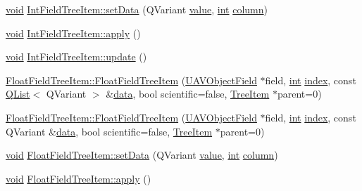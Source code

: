 \begin{DoxyCompactItemize}
\item 
\hyperlink{group___u_a_v_objects_plugin_ga444cf2ff3f0ecbe028adce838d373f5c}{void} \hyperlink{group___u_a_v_object_browser_plugin_ga3a9f3c8507db3aeab86e7bfafd5ab91b}{Int\-Field\-Tree\-Item\-::set\-Data} (Q\-Variant \hyperlink{glext_8h_aa0e2e9cea7f208d28acda0480144beb0}{value}, \hyperlink{ioapi_8h_a787fa3cf048117ba7123753c1e74fcd6}{int} \hyperlink{glext_8h_a3b58c39b1b7ca6f4012b27e84de3bdb3}{column})
\item 
\hyperlink{group___u_a_v_objects_plugin_ga444cf2ff3f0ecbe028adce838d373f5c}{void} \hyperlink{group___u_a_v_object_browser_plugin_ga24ca9e240126f614a138454ca00bd6b1}{Int\-Field\-Tree\-Item\-::apply} ()
\item 
\hyperlink{group___u_a_v_objects_plugin_ga444cf2ff3f0ecbe028adce838d373f5c}{void} \hyperlink{group___u_a_v_object_browser_plugin_ga8d58b6ded0f3e8c6d46cd4de99d0f061}{Int\-Field\-Tree\-Item\-::update} ()
\item 
\hyperlink{group___u_a_v_object_browser_plugin_ga3b5f17797e8c15bda91990e0224e64fd}{Float\-Field\-Tree\-Item\-::\-Float\-Field\-Tree\-Item} (\hyperlink{class_u_a_v_object_field}{U\-A\-V\-Object\-Field} $\ast$field, \hyperlink{ioapi_8h_a787fa3cf048117ba7123753c1e74fcd6}{int} \hyperlink{glext_8h_ab47dd9958bcadea08866b42bf358e95e}{index}, const \hyperlink{class_q_list}{Q\-List}$<$ Q\-Variant $>$ \&\hyperlink{glext_8h_a8850df0785e6fbcc2351af3b686b8c7a}{data}, bool scientific=false, \hyperlink{class_tree_item}{Tree\-Item} $\ast$parent=0)
\item 
\hyperlink{group___u_a_v_object_browser_plugin_ga2295cc6ac1cdf63b9bf6a35970e79669}{Float\-Field\-Tree\-Item\-::\-Float\-Field\-Tree\-Item} (\hyperlink{class_u_a_v_object_field}{U\-A\-V\-Object\-Field} $\ast$field, \hyperlink{ioapi_8h_a787fa3cf048117ba7123753c1e74fcd6}{int} \hyperlink{glext_8h_ab47dd9958bcadea08866b42bf358e95e}{index}, const Q\-Variant \&\hyperlink{glext_8h_a8850df0785e6fbcc2351af3b686b8c7a}{data}, bool scientific=false, \hyperlink{class_tree_item}{Tree\-Item} $\ast$parent=0)
\item 
\hyperlink{group___u_a_v_objects_plugin_ga444cf2ff3f0ecbe028adce838d373f5c}{void} \hyperlink{group___u_a_v_object_browser_plugin_ga3af0226a4922471e79087adc2d268710}{Float\-Field\-Tree\-Item\-::set\-Data} (Q\-Variant \hyperlink{glext_8h_aa0e2e9cea7f208d28acda0480144beb0}{value}, \hyperlink{ioapi_8h_a787fa3cf048117ba7123753c1e74fcd6}{int} \hyperlink{glext_8h_a3b58c39b1b7ca6f4012b27e84de3bdb3}{column})
\item 
\hyperlink{group___u_a_v_objects_plugin_ga444cf2ff3f0ecbe028adce838d373f5c}{void} \hyperlink{group___u_a_v_object_browser_plugin_ga4d5f38d08a56c3392536899254daf7d8}{Float\-Field\-Tree\-Item\-::apply} ()

\end{DoxyCompactItemize}
